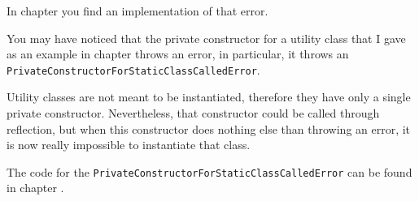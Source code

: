 In chapter  you find an implementation of that error.
 
\bigskip

You may have noticed that the private constructor for a utility class that I gave as an example in chapter  throws an error, in particular, it throws an \lstinline|PrivateConstructorForStaticClassCalledError|.

Utility classes are not meant to be instantiated, therefore they have only a single private constructor. Nevertheless, that constructor could be called through reflection, but when this constructor does nothing else than throwing an error, it is now really impossible to instantiate that class.

The code for the \lstinline|PrivateConstructorForStaticClassCalledError| can be found in chapter .


